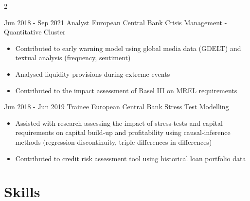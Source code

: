 \documentclass[
	10pt, %
]{FreemanCV}
\begin{document}
\begin{paracol}{2}




\jobentry
	{Jun 2018 - Sep 2021} %
	{Analyst} %
	{European Central Bank} %
	{Crisis Management - Quantitative Cluster} %
	{\begin{itemize}
		\item Contributed to early warning model using global media data (GDELT) and textual analysis (frequency, sentiment)
		\item Analysed liquidity provisions during extreme events
		\item Contributed to the impact assessment of Basel III on MREL requirements
	\end{itemize}} %

\jobentry
	{Jun 2018 - Jun 2019} %
	{Trainee} %
	{European Central Bank} %
	{Stress Test Modelling} %
	{\begin{itemize}
		\item Assisted with research assessing the impact of stress-tests and capital requirements on capital build-up and profitability using causal-inference methods (regression discontinuity, triple differences-in-differences)
		\item Contributed to credit risk assessment tool using historical loan portfolio data
	\end{itemize}} %



\section{Skills} 



\end{paracol}
\end{document}
